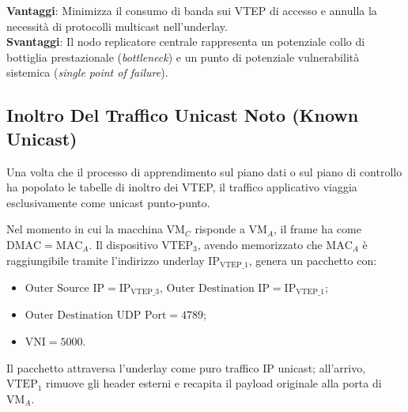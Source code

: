 \documentclass[11pt, a4paper]{article}
\begin{document}

\textbf{Vantaggi}: Minimizza il consumo di banda sui VTEP di accesso e annulla la necessità di protocolli multicast nell'underlay. \\
\textbf{Svantaggi}: Il nodo replicatore centrale rappresenta un potenziale collo di bottiglia prestazionale (\emph{bottleneck}) e un punto di potenziale vulnerabilità sistemica (\emph{single point of failure}).

\subsection{Inoltro Del Traffico Unicast Noto (Known Unicast)}

Una volta che il processo di apprendimento sul piano dati o sul piano di controllo ha popolato le tabelle di inoltro dei VTEP, il traffico applicativo viaggia esclusivamente come unicast punto-punto.


Nel momento in cui la macchina $\text{VM}_C$ risponde a $\text{VM}_A$, il frame ha come $\text{DMAC} = \text{MAC}_A$. Il dispositivo $\text{VTEP}_3$, avendo memorizzato che $\text{MAC}_A$ è raggiungibile tramite l'indirizzo underlay $\text{IP}_{\text{VTEP\_1}}$, genera un pacchetto con:
\begin{itemize}[noitemsep]
    \item $\text{Outer Source IP} = \text{IP}_{\text{VTEP\_3}}$, $\text{Outer Destination IP} = \text{IP}_{\text{VTEP\_1}}$;
    \item $\text{Outer Destination UDP Port} = 4789$;
    \item $\text{VNI} = 5000$.
\end{itemize}
Il pacchetto attraversa l'underlay come puro traffico IP unicast; all'arrivo, $\text{VTEP}_1$ rimuove gli header esterni e recapita il payload originale alla porta di $\text{VM}_A$.

\newpage

\end{document}
